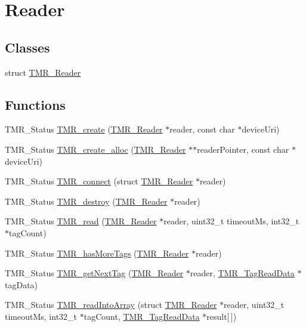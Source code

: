 \hypertarget{group__reader}{
\section{Reader}
\label{group__reader}
}
\subsection*{Classes}
\begin{CompactItemize}
\item 
struct \hyperlink{struct_t_m_r___reader}{TMR\_\-Reader}
\end{CompactItemize}
\subsection*{Functions}
\begin{CompactItemize}
\item 
TMR\_\-Status \hyperlink{group__reader_g77b9edd8d948ab1e1d9b95bf546cc43e}{TMR\_\-create} (\hyperlink{struct_t_m_r___reader}{TMR\_\-Reader} $\ast$reader, const char $\ast$deviceUri)
\item 
TMR\_\-Status \hyperlink{group__reader_g3a75a6998463bfdf20242a3fb9c82427}{TMR\_\-create\_\-alloc} (\hyperlink{struct_t_m_r___reader}{TMR\_\-Reader} $\ast$$\ast$readerPointer, const char $\ast$deviceUri)
\item 
TMR\_\-Status \hyperlink{group__reader_gf4d6e37515b6206807f60e2d21ca1e52}{TMR\_\-connect} (struct \hyperlink{struct_t_m_r___reader}{TMR\_\-Reader} $\ast$reader)
\item 
TMR\_\-Status \hyperlink{group__reader_gc0d51178a7d1d96ea82c8ea87b1697db}{TMR\_\-destroy} (\hyperlink{struct_t_m_r___reader}{TMR\_\-Reader} $\ast$reader)
\item 
TMR\_\-Status \hyperlink{group__reader_gb477ff41498adaa35ca5cae932ecfc70}{TMR\_\-read} (\hyperlink{struct_t_m_r___reader}{TMR\_\-Reader} $\ast$reader, uint32\_\-t timeoutMs, int32\_\-t $\ast$tagCount)
\item 
TMR\_\-Status \hyperlink{group__reader_g5925392bbb7aeafc0996144f354a533a}{TMR\_\-hasMoreTags} (\hyperlink{struct_t_m_r___reader}{TMR\_\-Reader} $\ast$reader)
\item 
TMR\_\-Status \hyperlink{group__reader_gbee8bf69ae6010858c5425956308292b}{TMR\_\-getNextTag} (\hyperlink{struct_t_m_r___reader}{TMR\_\-Reader} $\ast$reader, \hyperlink{struct_t_m_r___tag_read_data}{TMR\_\-TagReadData} $\ast$tagData)
\item 
TMR\_\-Status \hyperlink{group__reader_gcc9391a834e069adc7dca9e910f45c06}{TMR\_\-readIntoArray} (struct \hyperlink{struct_t_m_r___reader}{TMR\_\-Reader} $\ast$reader, uint32\_\-t timeoutMs, int32\_\-t $\ast$tagCount, \hyperlink{struct_t_m_r___tag_read_data}{TMR\_\-TagReadData} $\ast$result\mbox{[}$\,$\mbox{]})
$$
\end{CompactItemize}
